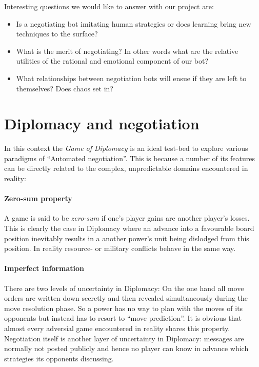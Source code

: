 \documentclass[pdftex,11pt,a4paper]{report}
\begin{document}
Interesting questions we would like to answer with our project are:

\begin{itemize}

\item Is a negotiating bot imitating human strategies or does 
      learning bring new techniques to the surface?

\item What is the merit of negotiating? In other words what 
      are the relative utilities of the rational and emotional
      component of our bot?

\item What relationships between negotiation bots will ensue 
      if they are left to themselves? Does chaos set in?

\end{itemize}

\section{Diplomacy and negotiation}

In this context the \textit{Game of Diplomacy} is an ideal test-bed to
explore various paradigms of ``Automated negotiation''. This is
because a number of its features can be directly related to the
complex, unpredictable domains encountered in reality:

\paragraph{Zero-sum property}
A game is said to be \textit{zero-sum} if one's player gains are
another player's losses. This is clearly the case in Diplomacy where
an advance into a favourable board position inevitably results in a
another power's unit being dislodged from this position. In reality
resource- or military conflicts behave in the same way.

\paragraph{Imperfect information}
There are two levels of uncertainty in Diplomacy: On the one hand all
move orders are written down secretly and then revealed simultaneously
during the move resolution phase. So a power has no way to plan with
the moves of its opponents but instead has to resort to ``move
prediction''. It is obvious that almost every adversial game
encountered in reality shares this property. Negotiation itself is
another layer of uncertainty in Diplomacy: messages are normally not
posted publicly and hence no player can know in advance which
strategies its opponents discussing.
\end{document}
